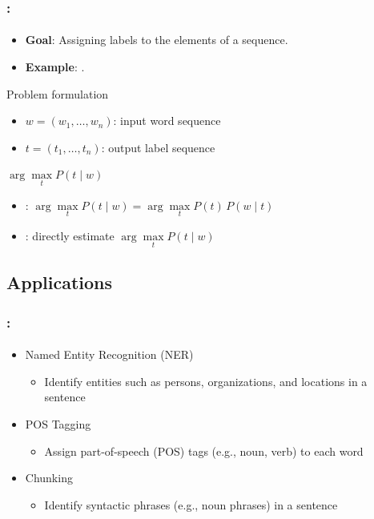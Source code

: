 \documentclass[xcolor=table]{beamer}
\begin{document}
\begin{frame}
	\frametitle{\insertshortsubtitle: \insertsection}
	\framesubtitle{\insertsubsection}

	\begin{itemize}
		\item \textbf{Goal}: Assigning labels to the elements of a sequence.
		\item \textbf{Example}: .
	\end{itemize}
	
	\begin{block}{Problem formulation}
		\begin{itemize}
			\item $w = (w_1, \ldots, w_n)$: input word sequence
			\item $t = (t_1, \ldots, t_n)$: output label sequence
		\end{itemize}
		\begin{center}
			$\arg\max\limits_t P(t \mid w)$
		\end{center}
		
		\begin{itemize}
			\item {}: 
			$\arg\max\limits_t P(t \mid w) = \arg\max\limits_t P(t)\,P(w \mid t)$ %
			\item {}: directly estimate $\arg\max\limits_t P(t \mid w)$
		\end{itemize}
	\end{block}

\end{frame}

\subsection{Applications}

\begin{frame}
	\frametitle{\insertshortsubtitle: \insertsection}
	\framesubtitle{\insertsubsection}

	\begin{itemize}
		\item Named Entity Recognition (NER)
		\begin{itemize}
			\item Identify entities such as persons, organizations, and locations in a sentence
		\end{itemize}
		
		\item POS Tagging
		\begin{itemize}
			\item Assign part-of-speech (POS) tags (e.g., noun, verb) to each word
		\end{itemize}
		
		\item Chunking
		\begin{itemize}
			\item Identify syntactic phrases (e.g., noun phrases) in a sentence
		\end{itemize}
	\end{itemize}

\end{frame}
\end{document}
